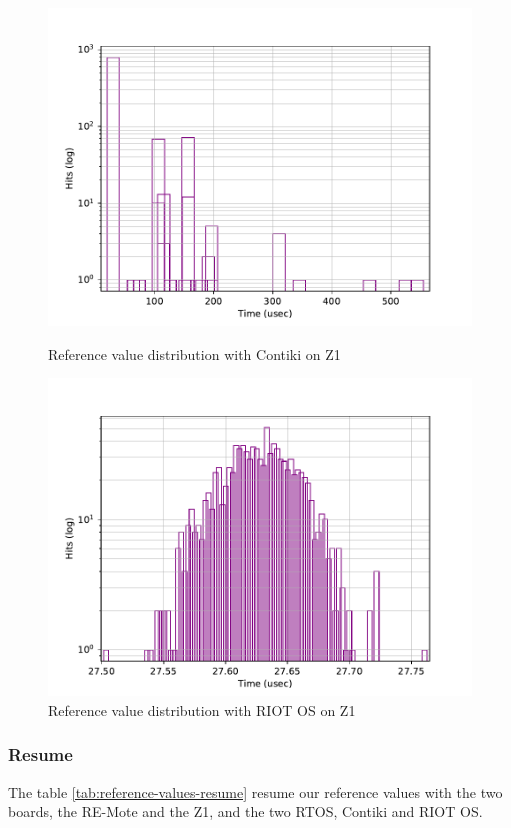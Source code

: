 \begin{figure}[!ht]
    \begin{minipage}{.45\textwidth}
        \centering
        \includegraphics[scale=.4]{assets/reference-value-contiki-z1.pdf}
        \caption{Reference value distribution with Contiki on Z1\label{fig:reference-value-contiki-z1}}
    \end{minipage}\hfill
    \begin{minipage}{.45\textwidth}        
        \centering
        \includegraphics[scale=.4]{assets/reference-value-riot-z1.pdf}
        \caption{Reference value distribution with RIOT OS on Z1\label{fig:reference-value-riot-z1}}
    \end{minipage}
\end{figure}

\subsubsection{Resume}
The table \ref{tab:reference-values-resume} resume our reference values with the two boards, the RE-Mote and the Z1, and the two RTOS, Contiki and RIOT OS.

